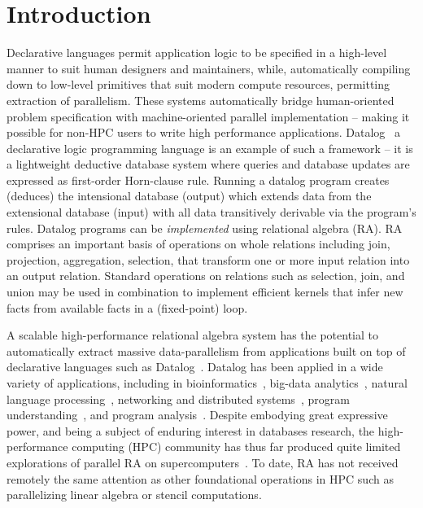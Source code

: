\section{Introduction}

Declarative languages permit application logic to be specified in a high-level manner to suit human designers and maintainers, while, automatically compiling down to low-level primitives that suit modern compute resources, permitting extraction of parallelism. These systems automatically bridge human-oriented problem specification with machine-oriented parallel implementation -- making it possible for non-HPC users to write high performance applications.
Datalog~\cite{Aref:2015, ceri1989you, de2012datalog, huang2011datalog, ullman1983principles} a declarative logic programming language is an example of such a framework -- it is a lightweight deductive database system where queries and database updates are expressed as first-order Horn-clause rule. Running a datalog program creates (deduces) the intensional database (output) which extends data from the extensional database (input) with all data transitively derivable via the program’s rules. Datalog programs can be \emph{implemented} using relational algebra (RA).
RA comprises an important basis of operations on whole relations including join, projection, aggregation, selection, that transform one or more input relation into an output relation.
Standard operations on relations such as selection, join, and union may be used in combination to implement efficient kernels that infer new facts from available facts in a (fixed-point) loop. 

A scalable high-performance relational algebra system has the potential to automatically extract massive data-parallelism from applications built on top of declarative languages such as Datalog~\cite{Aref:2015, ceri1989you, de2012datalog, huang2011datalog, ullman1983principles}. Datalog has been applied in a wide variety of applications, including in bioinformatics~\cite{king2004applying}, big-data analytics~\cite{halperin2014demonstration, seo2013socialite, shkapsky2016big}, natural language processing~\cite{mooney1996inductive}, networking and distributed systems~\cite{alvaro2010dedalus, conway2012logic, loo2009declarative}, program understanding~\cite{hajiyev2006codequest}, and program analysis~\cite{bravenboer2009strictly, lam2005context, smaragdakis2013set}. Despite embodying great expressive power, and being a subject of enduring interest in databases research, the high-performance computing (HPC) community has thus far produced quite limited explorations of parallel RA on supercomputers~\cite{balkesen2013multi, Cacace:1991:OPS:111828.111831, Cheiney:1990:PST:94362.94445, kim2009sort, Valduriez:1988:PET:54616.54618}. To date, RA has not received remotely the same attention as other foundational operations in HPC such as parallelizing linear algebra or stencil computations.
